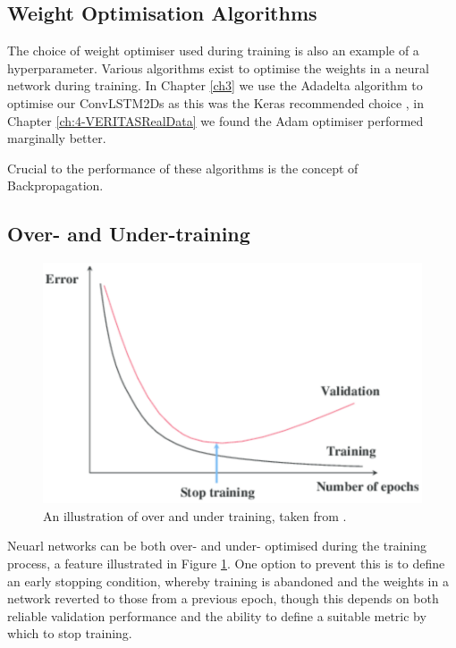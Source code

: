 \subsection{Weight Optimisation Algorithms}
The choice of weight optimiser used during training is also an example of a hyperparameter. Various algorithms exist to optimise the weights in a neural network during training. In Chapter \ref{ch3} we use the Adadelta algorithm to optimise our ConvLSTM2Ds as this was the Keras recommended choice \cite{adadelta}, in Chapter \ref{ch:4-VERITASRealData} we found the Adam optimiser performed marginally better.

Crucial to the performance of these algorithms is the concept of Backpropagation.

\subsection{Over- and Under-training}
\begin{figure}[ht] 
        \centering \includegraphics[width=0.5\columnwidth]{figures/overtrain.png}
        \caption{
                \label{fig:earlystop} %
                An illustration of over and under training, taken from \cite{early}.
        }
\end{figure}

Neuarl networks can be both over- and under- optimised during the training process, a feature illustrated in Figure \ref{fig:earlystop}. One option to prevent this is to define an early stopping condition, whereby training is abandoned and the weights in a network reverted to those from a previous epoch, though this depends on both reliable validation performance and the ability to define a suitable metric by which to stop training.


